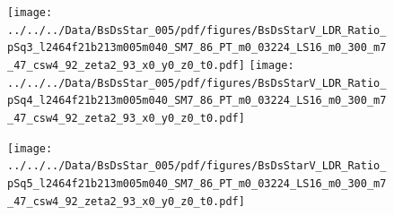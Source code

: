 \documentclass[a4paper,10pt]{article}
\begin{document}
\clearpage
\begin{figure}[p]
 \texttt{[image: ../../../Data/BsDsStar\_005/pdf/figures/BsDsStarV\_LDR\_Ratio\_pSq3\_l2464f21b213m005m040\_SM7\_86\_PT\_m0\_03224\_LS16\_m0\_300\_m7\_47\_csw4\_92\_zeta2\_93\_x0\_y0\_z0\_t0.pdf]} 
 \texttt{[image: ../../../Data/BsDsStar\_005/pdf/figures/BsDsStarV\_LDR\_Ratio\_pSq4\_l2464f21b213m005m040\_SM7\_86\_PT\_m0\_03224\_LS16\_m0\_300\_m7\_47\_csw4\_92\_zeta2\_93\_x0\_y0\_z0\_t0.pdf]} 
 \end{figure}
\begin{figure}[p]
 \texttt{[image: ../../../Data/BsDsStar\_005/pdf/figures/BsDsStarV\_LDR\_Ratio\_pSq5\_l2464f21b213m005m040\_SM7\_86\_PT\_m0\_03224\_LS16\_m0\_300\_m7\_47\_csw4\_92\_zeta2\_93\_x0\_y0\_z0\_t0.pdf]} 
 \end{figure}
\clearpage
\end{document}
